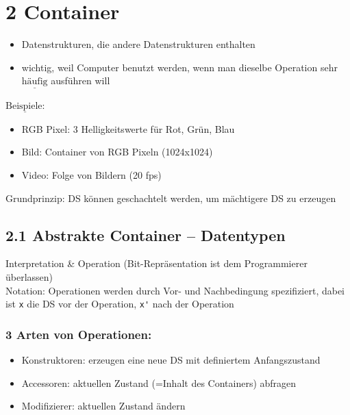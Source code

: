 \documentclass[11pt, fleqn]{scrreprt}
\begin{document}
\chapter*{2 Container}
\begin{itemize}[label={-}]
    \item Datenstrukturen, die andere Datenstrukturen enthalten
    \item wichtig, weil Computer benutzt werden, wenn man dieselbe Operation sehr $\underline{\text{häufig}}$ ausführen will
\end{itemize}
$\underline{\text{Beispiele:}}$
\begin{itemize}[label={-}]
    \item RGB Pixel: 3 Helligkeitswerte für Rot, Grün, Blau
    \item Bild: Container von RGB Pixeln (1024x1024)
    \item Video: Folge von Bildern (20 fps)
\end{itemize}
Grundprinzip: DS können geschachtelt werden, um mächtigere DS zu erzeugen



\section*{2.1 Abstrakte Container – Datentypen}

Interpretation \& Operation (Bit-Repräsentation ist dem Programmierer überlassen) \\

Notation: Operationen werden durch Vor- und Nachbedingung spezifiziert, dabei ist \verb|x| die DS vor der Operation, \verb|x'| nach der Operation \\

\subsection*{3 Arten von Operationen: }
\begin{itemize}[label={-}]
    \item Konstruktoren: erzeugen eine neue DS mit definiertem Anfangszustand
    \item Accessoren: aktuellen Zustand (=Inhalt des Containers) abfragen
    \item Modifizierer: aktuellen Zustand ändern
\end{itemize}
\end{document}
